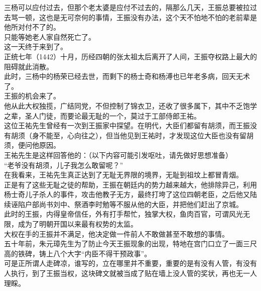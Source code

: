 \begin{multicols}{\theparacolNo}
三杨可以应付过去，但那个老太婆是应付不过去的，隔那么几天，王振总要被拉过去骂一顿，这也是无可奈何的事情，王振没有办法，这个天不怕地不怕的老前辈是他所对付不了的。\\

只能等她老人家自然死亡了。\\

这一天终于来到了。\\

正统七年（1442）十月，历经四朝的张太祖太后离开了人间，王振夺权路上最大的阻碍就此消散。\\

此时，三杨中的杨荣已经去世，而剩下的杨士奇和杨溥也已年老多病，回天无术了。\\

王振的机会来了。\\

他从此大权独揽，广结同党，不但控制了锦衣卫，还收了很多属下，其中不乏饱学之辈，圣人门徒，而要论最无耻的一个，莫过于工部侍郎王祐。\\

这位王祐先生曾经有一次到王振家中探望。在明代，大臣们都留有胡须，而王振没有胡须（身不能至，心向往之），但当他见到王祐时，才发现这位大臣也没有留胡须，便问他原因。\\

王祐先生是这样回答他的：（以下内容可能引发呕吐，请先做好思想准备）\\

“老爷没有胡须，儿子我怎么敢留呢？”\\

在我看来，王祐先生真正达到了无耻无界限的境界，无耻到祖坟上都冒青烟。\\

正是有了这些无耻之徒的帮助，王振在朝廷内的势力越来越大，他排除异己，利用杨士奇儿子杀人的事件，攻击他教子无方，最终打垮了这位四朝老臣，之后他又陆续诬陷户部尚书刘中、祭酒李时勉等不服从他的大臣，并把他们赶出了京城。\\

此时的王振，内得皇帝信任，外有打手帮忙，独掌大权，鱼肉百官，可谓风光无限，成为了明朝开国以来最有权势的太监。\\

大权在手的王振并不满足，他决定做一件前人不敢做甚至不敢想的事情。\\

五十年前，朱元璋先生为了防止今天王振现象的出现，特地在宫门口立了一面三尺高的铁碑，铸上八个大字“内臣不得干预政事”。\\

可是正所谓人走碑凉，谁写的，立在哪里并不重要，重要的是有没有人管，有没有人执行，到了王振当权，这块碑文就被当成了贴在墙上没人管的奖状，再也无一人理睬。\\


\end{multicols}
